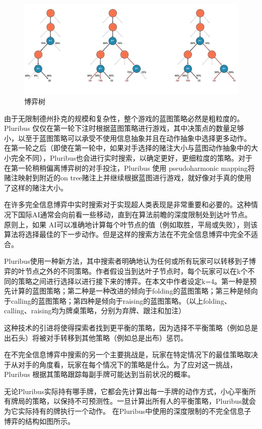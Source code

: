 \documentclass{article}
\begin{document}
\begin{figure}[h!]
	\centering
	\includegraphics[scale=0.6]{c}
	\caption{博弈树}
	\label{fig:universe}
\end{figure}
由于无限制德州扑克的规模和复杂性，整个游戏的蓝图策略必然是粗粒度的。Pluribus 仅仅在第一轮下注时根据蓝图策略进行游戏，其中决策点的数量足够小，以至于蓝图策略可以承受不使用信息抽象并且在动作抽象中选择更多动作。 在第一轮之后（即使在第一轮中，如果对手选择的赌注大小与蓝图动作抽象中的大小完全不同），Pluribus也会进行实时搜索，以确定更好，更细粒度的策略。对于在第一轮稍稍偏离博弈树的对手投注，Pluribus 使用 pseudoharmonic mapping将赌注映射到附近的on tree赌注上并继续根据蓝图进行游戏，就好像对手真的使用了这样的赌注大小。\par
在许多完全信息博弈中实时搜索对于实现超人类表现是非常重要和必要的。这种情况下国际AI通常会向前看一些移动，直到在算法前瞻的深度限制处到达叶节点。原则上，如果 AI可以准确地计算每个叶节点的值（例如取胜，平局或失败），则该算法将选择最佳的下一步动作。但是这样的搜索方法在不完全信息博弈中完全不适合。\par
Pluribus使用一种新方法，其中搜索者明确地认为任何或所有玩家可以转移到子博弈的叶节点之外的不同策略。作者假设当到达叶子节点时，每个玩家可以在k个不同的策略之间进行选择以进行接下来的博弈。在本文中作者设定k=4。第一种是预先计算的蓝图策略；第二种是一种改进的倾向于folding的蓝图策略；第三种是倾向于calling的蓝图策略；第四种是倾向于raising的蓝图策略。（以上folding、calling、raising均为牌桌策略，分别为弃牌、跟注和加注）\par
这种技术的引进将使得探索者找到更平衡的策略，因为选择不平衡策略（例如总是出石头）将被对手转移到其他策略（例如总是出布）惩罚。\par
在不完全信息博弈中搜索的另一个主要挑战是，玩家在特定情况下的最佳策略取决于从对手的角度看，玩家在每个情况下的策略是什么。为了应对这一挑战，Pluribus 根据其策略跟踪每副手牌可能达到当前状况的概率。\par 无论Pluribus实际持有哪手牌，它都会先计算出每一手牌的动作方式，小心平衡所有牌局的策略，以保持不可预测性。一旦计算出所有人的平衡策略，Pluribus就会为它实际持有的牌执行一个动作。 在Pluribus中使用的深度限制的不完全信息子博弈的结构如图所示。\par
\end{document}
